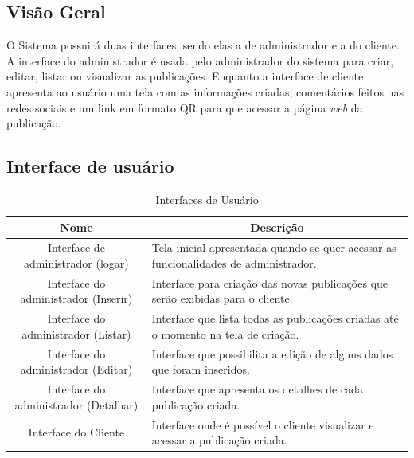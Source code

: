 \subsection{Visão Geral}
O Sistema possuirá duas interfaces, sendo elas a de administrador e a do cliente.
A  interface  do  administrador  é  usada  pelo  administrador  do  sistema  para  criar, editar, listar ou visualizar as publicações. Enquanto a interface de cliente apresenta ao  usuário  uma  tela  com  as  informações  criadas,  comentários  feitos  nas  redes  sociais e um link em formato QR para que acessar a página \textit{web} da publicação.


\subsection{Interface de usuário}
\begin{table}[H]
\caption{Interfaces de Usuário}
\begin{tabularx}{\textwidth}{|c|X|}
\hline
Nome & \multicolumn{1}{c|}{Descrição} \\ \hline
Interface de administrador (logar) & Tela inicial apresentada quando se quer acessar as funcionalidades de administrador. \\ \hline
Interface do administrador (Inserir) & Interface para criação das novas publicações que serão exibidas para o cliente. \\ \hline
Interface do administrador (Listar) & Interface que lista todas as publicações criadas até o momento na tela de criação. \\ \hline
Interface do administrador (Editar) & Interface que possibilita a edição de alguns dados que foram inseridos. \\ \hline
Interface do administrador (Detalhar) & Interface que apresenta os detalhes de cada publicação criada. \\ \hline
Interface do Cliente & Interface onde é possível o cliente visualizar e acessar a publicação criada. \\ \hline
\end{tabularx}
\end{table}

